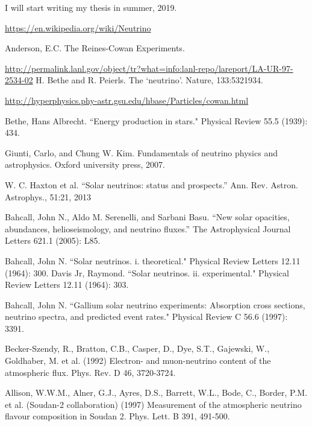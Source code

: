\documentclass[preprint,12pt]{elsarticle}
\numberwithin{equation}{section}
\begin{document}
I will start writing my thesis in summer, 2019.

\vspace{30mm}


\begin{thebibliography}{00}
 \url{https://en.wikipedia.org/wiki/Neutrino}	

 Anderson, E.C. The Reines-Cowan Experiments. 

\url{http://permalink.lanl.gov/object/tr?what=info:lanl-repo/lareport/LA-UR-97-2534-02}
 H. Bethe and R. Peierls. The `neutrino'. Nature, 133:5321934.

 \url{http://hyperphysics.phy-astr.gsu.edu/hbase/Particles/cowan.html}

 Bethe, Hans Albrecht. ``Energy production in stars." Physical Review 55.5 (1939): 434.

 Giunti, Carlo, and Chung W. Kim. Fundamentals of neutrino physics and astrophysics. Oxford university press, 2007.

 W. C. Haxton et al. ``Solar neutrinos: status and prospects.'' Ann. Rev. Astron. Astrophys., 51:21, 2013

 Bahcall, John N., Aldo M. Serenelli, and Sarbani Basu. ``New solar opacities, abundances, helioseismology, and neutrino fluxes.'' The Astrophysical Journal Letters 621.1 (2005): L85.


 Bahcall, John N. ``Solar neutrinos. i. theoretical." Physical Review Letters 12.11 (1964): 300.
 Davis Jr, Raymond. ``Solar neutrinos. ii. experimental." Physical Review Letters 12.11 (1964): 303.

 Bahcall, John N. ``Gallium solar neutrino experiments: Absorption cross sections, neutrino spectra, and predicted event rates." Physical Review C 56.6 (1997): 3391.

 Becker-Szendy, R., Bratton, C.B., Casper, D., Dye, S.T., Gajewski, W., Goldhaber, M. et al. (1992) Electron- and muon-neutrino content of the atmospheric flux. Phys. Rev. D 46, 3720-3724.

 Allison, W.W.M., Alner, G.J., Ayres, D.S., Barrett, W.L., Bode, C., Border, P.M. et al. (Soudan-2 collaboration) (1997) Measurement of the atmospheric neutrino flavour composition in Soudan 2. Phys. Lett. B 391, 491-500.


\end{thebibliography}
\end{document}
